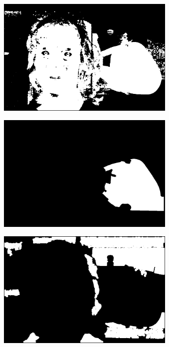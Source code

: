 \begin{figure}[H]
\begin{subfigure}{.24\textwidth}
  \centering
  \includegraphics[width=0.95\textwidth]{img/fd/EstimatedSkinMask.png}
  \caption{}
\end{subfigure}%
\begin{subfigure}{.24\textwidth}
  \centering
  \includegraphics[width=0.95\textwidth]{img/fd2/BackgroundMask.png}
  \caption{}
\end{subfigure}
\begin{subfigure}{.24\textwidth}
  \centering
  \includegraphics[width=0.95\textwidth]{img/fd/NonFaceMask.png}

\end{subfigure}
\end{figure}
